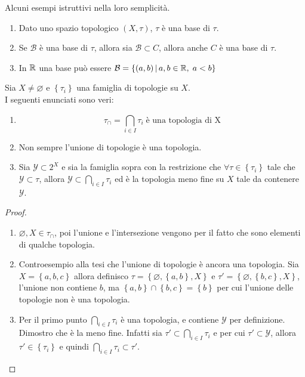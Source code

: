 \begin{example}
	Alcuni esempi istruttivi nella loro semplicità.
	\begin{enumerate}
		\item Dato uno spazio topologico $(X,\tau)$, $\tau$ è una base di $\tau$. 
		\item Se $\mathcal{B}$ è una base di $\tau$, allora sia $\mathcal{B} \subset C$, allora anche $C$ è una base di $\tau$.
		\item In $\mathbb{R}$ una base può essere $\mathcal{B} = \left\{(a,b) \,\middle|\, a,b \in \mathbb{R}, \; a < b \right\}$
	\end{enumerate}
\end{example}

\begin{proposition}
	Sia $X \neq \varnothing$ e $\left\{\tau_i\right\}$ una famiglia di topologie su $X$. \\ I seguenti enunciati sono veri:
	\begin{enumerate}
		\item 
		\begin{equation*}
			\tau_\cap = \bigcap_{i \in I} \tau_i \; \text{è una topologia di X} 
		\end{equation*}
		\item Non sempre l'unione di topologie è una topologia.
		\item Sia $\mathcal{Y} \subset 2^X$ e sia la famiglia sopra con la restrizione che $\forall \tau \in \left\{\tau_i\right\}$ tale che $\mathcal{Y} \subset \tau$, allora $\mathcal{Y} \subset \bigcap_{i \in I} \tau_i $ ed è la topologia meno fine su $X$ tale da contenere $\mathcal{Y}$.
	\end{enumerate}
\end{proposition}
\begin{proof} \
	\begin{enumerate}
		\item $\varnothing, X \in \tau_\cap$, poi l'unione e l'intersezione vengono per il fatto che sono elementi di qualche topologia.
		\item Controesempio alla tesi che l'unione di topologie è ancora una topologia. Sia $X = \left\{a,b,c\right\}$ allora definisco $\tau = \left\{\varnothing, \left\{a,b\right\}, X\right\}$ e $\tau' = \left\{\varnothing, \left\{b,c\right\}, X\right\}$, l'unione non contiene $b$, ma $\left\{a,b\right\} \cap \left\{b,c\right\} = \left\{b\right\}$ per cui l'unione delle topologie non è una topologia.
		\item Per il primo punto $\bigcap_{i \in I} \tau_i$ è una topologia, e contiene $\mathcal{Y}$ per definizione. \\ Dimostro che è la meno fine. Infatti sia $\tau' \subset \bigcap_{i \in I} \tau_i$ e per cui $\tau' \subset \mathcal{Y}$, allora $\tau' \in \left\{\tau_i\right\}$ e quindi $\bigcap_{i \in I} \tau_i \subset \tau'$. 
	\end{enumerate}	
\end{proof}

